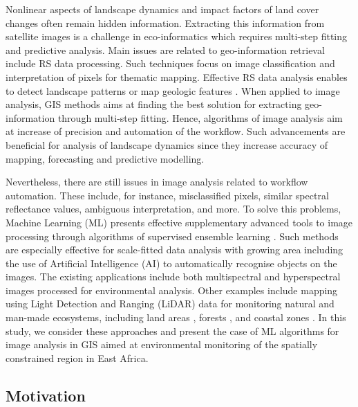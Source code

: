 \documentclass[sn-mathphys-num]{sn-jnl}%
\theoremstyle{thmstyleone}%
\theoremstyle{thmstyletwo}%
\theoremstyle{thmstylethree}%
\begin{document}
Nonlinear aspects of landscape dynamics and impact factors of land cover changes often remain hidden information. Extracting this information from satellite images is a challenge in eco-informatics which requires multi-step fitting and predictive analysis. Main issues are related to geo-information retrieval include RS data processing. Such techniques focus on image classification and interpretation of pixels for thematic mapping. Effective RS data analysis enables to detect landscape patterns \cite{asi6040061,Lemenkova20234964} or map geologic features \cite{DEFFO2024e26319,NWAILA202271,MONO2024135,ASGHEDE2025101722}. When applied to image analysis, GIS methods aims at finding the best solution for extracting geo-information through multi-step fitting. Hence, algorithms of image analysis aim at increase of precision and automation of the workflow. Such advancements are beneficial for analysis of landscape dynamics since they increase accuracy of mapping, forecasting and predictive modelling.

Nevertheless, there are still issues in image analysis related to workflow automation. These include, for instance, misclassified pixels, similar spectral reflectance values, ambiguous interpretation, and more. To solve this problems, Machine Learning (ML) presents effective supplementary advanced tools to image processing through algorithms of supervised ensemble learning \cite{plants14182841}. Such methods are especially effective for scale-fitted data analysis with growing area including the use of Artificial Intelligence (AI) to automatically recognise objects on the images. The existing applications include both multispectral \cite{Lemenkova20253769,horticulturae11091073} and hyperspectral images \cite{rs17173126,horticulturae11091077} processed for environmental analysis. Other examples include mapping using Light Detection and Ranging (LiDAR) data for monitoring natural and man-made ecosystems, including land areas \cite{s25164991,rs17152733}, forests \cite{f16091381,rs17173011}, and coastal zones \cite{rs17162912}. In this study, we consider these approaches and present the case of ML algorithms for image analysis in GIS aimed at environmental monitoring of the spatially constrained region in East Africa.

\subsection{Motivation}
\end{document}
